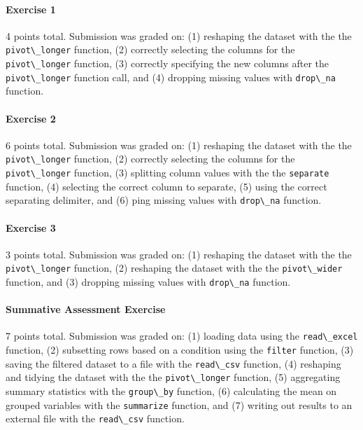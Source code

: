 \documentclass[acmsmall]{acmart}
\newcommand{\code}[1]{\lstinline{#1}}
\begin{document}
\paragraph{Exercise 1}

4 points total.
Submission was graded on:
(1) reshaping the dataset with the the \code{pivot\_longer} function,
(2) correctly selecting the columns for the \code{pivot\_longer} function,
(3) correctly specifying the new columns after the \code{pivot\_longer} function call, and
(4) dropping missing values with \code{drop\_na} function.

\paragraph{Exercise 2}

6 points total.
Submission was graded on:
(1) reshaping the dataset with the the \code{pivot\_longer} function,
(2) correctly selecting the columns for the \code{pivot\_longer} function,
(3) splitting column values with the the \code{separate} function,
(4) selecting the correct column to separate,
(5) using the correct separating delimiter, and
(6) ping missing values with \code{drop\_na} function.

\paragraph{Exercise 3}

3 points total.
Submission was graded on:
(1) reshaping the dataset with the the \code{pivot\_longer} function,
(2) reshaping the dataset with the the \code{pivot\_wider} function, and
(3) dropping missing values with \code{drop\_na} function.

\paragraph{Summative Assessment Exercise}

7 points total.
Submission was graded on:
(1) loading data using the \code{read\_excel} function,
(2) subsetting rows based on a condition using the \code{filter} function,
(3) saving the filtered dataset to a file with the \code{read\_csv} function,
(4) reshaping and tidying the dataset with the the \code{pivot\_longer} function,
(5) aggregating summary statistics with the \code{group\_by} function,
(6) calculating the mean on grouped variables with the \code{summarize} function, and
(7) writing out results to an external file with the \code{read\_csv} function.
\end{document}
